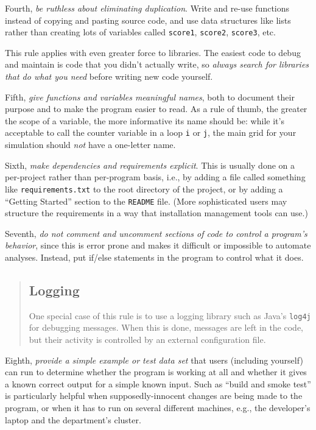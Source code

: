 \documentclass[10pt]{article}
\begin{document}
Fourth, \emph{be ruthless about eliminating duplication}. Write and
re-use functions instead of copying and pasting source code, and use
data structures like lists rather than creating lots of variables called
\texttt{score1}, \texttt{score2}, \texttt{score3}, etc.

This rule applies with even greater force to libraries. The easiest code
to debug and maintain is code that you didn't actually write, so
\emph{always search for libraries that do what you need} before writing
new code yourself.

Fifth, \emph{give functions and variables meaningful names}, both to
document their purpose and to make the program easier to read. As a rule
of thumb, the greater the scope of a variable, the more informative its
name should be: while it's acceptable to call the counter variable in a
loop \texttt{i} or \texttt{j}, the main grid for your simulation should
\emph{not} have a one-letter name.

Sixth, \emph{make dependencies and requirements explicit}. This is
usually done on a per-project rather than per-program basis, i.e., by
adding a file called something like \texttt{requirements.txt} to the
root directory of the project, or by adding a ``Getting Started''
section to the \texttt{README} file. (More sophisticated users may
structure the requirements in a way that installation management tools
can use.)

Seventh, \emph{do not comment and uncomment sections of code to control
a program's behavior}, since this is error prone and makes it difficult
or impossible to automate analyses. Instead, put if/else statements in
the program to control what it does.

\begin{quote}
\subsection*{Logging}

One special case of this rule is to use a logging library such as Java's
\texttt{log4j} for debugging messages. When this is done, messages are
left in the code, but their activity is controlled by an external
configuration file.
\end{quote}

Eighth, \emph{provide a simple example or test data set} that users
(including yourself) can run to determine whether the program is working
at all and whether it gives a known correct output for a simple known
input. Such as ``build and smoke test'' is particularly helpful when
supposedly-innocent changes are being made to the program, or when it
has to run on several different machines, e.g., the developer's laptop
and the department's cluster.
\end{document}
